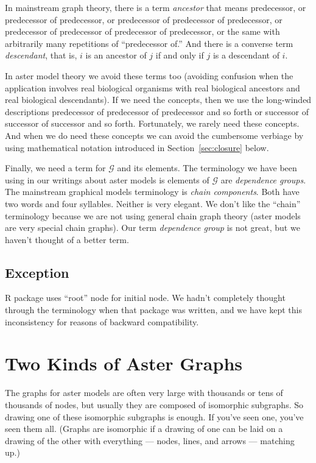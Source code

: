 In mainstream graph theory, there is a term \emph{ancestor} that means
predecessor, or predecessor of predecessor,
or predecessor of predecessor of predecessor,
or predecessor of predecessor of predecessor of predecessor,
or the same with arbitrarily many repetitions of ``predecessor of.''
And there is a converse term \emph{descendant}, that is, $i$ is an ancestor
of $j$ if and only if $j$ is a descendant of $i$.

In aster model theory we avoid these terms too (avoiding confusion when
the application involves real biological organisms with real biological
ancestors and real biological descendants).  If we need the concepts,
then we use the long-winded descriptions
predecessor of predecessor of predecessor and so forth or
successor of successor of successor and so forth.
Fortunately, we rarely need these concepts.
And when we do need these concepts we can avoid the cumbersome verbiage
by using mathematical notation introduced in Section~\ref{sec:closure}
below.

Finally, we need a term for $\mathcal{G}$ and its elements.
The terminology we have been using in our writings about aster models is
elements of $\mathcal{G}$ are \emph{dependence groups}.
The mainstream graphical models terminology \citep{lauritzen} is
\emph{chain components}.  Both have two words and four syllables.
Neither is very elegant.  We don't like the ``chain'' terminology because
we are not using general chain graph theory (aster models are very special
chain graphs).  Our term \emph{dependence group} is not great, but we haven't
thought of a better term.

\subsection{Exception}
\label{sec:exception-root}

R package  uses ``root'' node for initial node.
We hadn't completely thought through the terminology when that package
was written, and we have kept this inconsistency for reasons of backward
compatibility.

\section{Two Kinds of Aster Graphs}
\label{sec:scare-quotes}

The graphs for aster models are often very large with thousands or tens of
thousands of nodes, but usually they are composed of isomorphic subgraphs.
So drawing one of these isomorphic subgraphs is enough.
If you've seen one, you've seen them all.
(Graphs are isomorphic if a drawing of one can be laid on a drawing of the
other with everything --- nodes, lines, and arrows --- matching up.)


